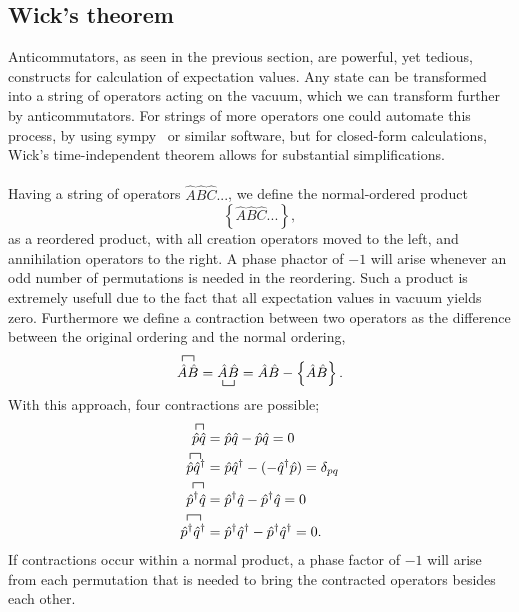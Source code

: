 \subsection{Wick's theorem}
Anticommutators, as seen in the previous section, are powerful, yet
tedious, constructs for calculation of expectation values.
Any state can be transformed into a string of operators acting on the vacuum,
which we can transform further by anticommutators.
For strings of more operators one could automate this process, by using sympy~\cite{sympy}
or similar software, but for closed-form 
calculations, Wick's time-independent theorem allows for substantial  simplifications.

\paragraph*{}
Having a string of operators $\hat{A} \hat{B} \hat{C} ...$, we define the
normal-ordered product 
\begin{equation}
\left\lbrace  \hat{A} \hat{B} \hat{C} ...  \right\rbrace ,
\end{equation}
as a reordered product, with all creation operators moved to the left, and
annihilation operators to the right.
A phase phactor of $-1$ will arise whenever an odd number of permutations is
needed in the reordering.
Such a product is extremely usefull due to the fact that all expectation values
in vacuum yields zero.
Furthermore we define a contraction between two operators as the difference between the original
ordering and the normal ordering,
\begin{equation}
\contraction[1ex]{}{\hat{A}}{}{\hat{B}}
\hat{A}\hat{B}
=
\bcontraction[1ex]{}{\hat{A}}{}{\hat{B}}
\hat{A}\hat{B}
=
\hat{A}\hat{B} - \left\lbrace \hat{A}\hat{B} \right\rbrace .
\end{equation}
With this approach, four contractions are possible;
\begin{equation}
\label{eq:manybody:vacuumcontractions}
\begin{split}
\contraction[1ex]{}{\hat{p}}{}{\hat{q}}
\hat{p}\hat{q} &= \hat{p}\hat{q} - \hat{p}\hat{q} = 0 \\
%
\contraction[1ex]{}{\hat{p}}{}{\hat{q}^{\dagger}}
\hat{p}\hat{q}^{\dagger} &= \hat{p}\hat{q}^{\dagger} -(-\hat{q}^{\dagger}
\hat{p}) = \delta_{pq}\\
%
\contraction[1ex]{}{\hat{p}^{\dagger}}{}{\hat{q}}
\hat{p}^{\dagger}\hat{q} &= \hat{p}^{\dagger}\hat{q} - \hat{p}^{\dagger}\hat{q}
= 0\\
%
\contraction[1ex]{}{\hat{p}^{\dagger}}{}{\hat{q}^{\dagger}}
\hat{p}^{\dagger}\hat{q}^{\dagger} &= \hat{p}^{\dagger}\hat{q}^{\dagger} -
\hat{p}^{\dagger}\hat{q}^{\dagger} = 0  .
\end{split}
\end{equation}
If contractions occur within a normal product, a phase factor of $-1$ will
arise from each permutation that is needed to bring the contracted operators
besides each other.

